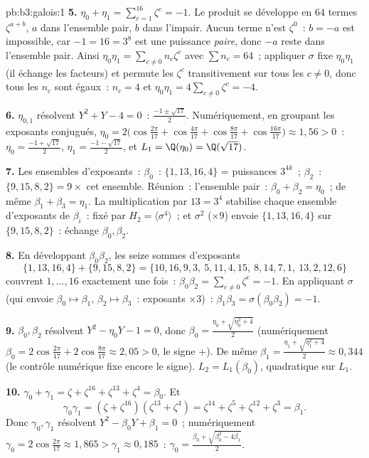 \begin{solution}{pb:b3:galois:1}
\textbf{5.} $\eta_0 + \eta_1 = \sum_{c=1}^{16}\zeta^c = -1$. Le
produit se développe en $64$ termes $\zeta^{a + b}$, $a$ dans
l'ensemble pair, $b$ dans l'impair. Aucun terme n'est
$\zeta^0$~: $b = -a$ est impossible, car $-1 = 16 = 3^8$ est
une puissance \emph{paire}, donc $-a$ reste dans l'ensemble
pair. Ainsi $\eta_0\eta_1 = \sum_{c \neq 0} n_c\zeta^c$ avec
$\sum n_c = 64$~; appliquer $\sigma$ fixe $\eta_0\eta_1$ (il
échange les facteurs) et permute les $\zeta^c$
transitivement sur tous les $c \neq 0$, donc tous les $n_c$
sont égaux~: $n_c = 4$ et $\eta_0\eta_1 =
4\sum_{c\neq0}\zeta^c = -4$.

\textbf{6.} $\eta_{0,1}$ résolvent $Y^2 + Y - 4 = 0$~:
$\frac{-1 \pm \sqrt{17}}2$. Numériquement, en groupant les
exposants conjugués, $\eta_0 = 2\bigl(\cos\tfrac{2\pi}{17} +
\cos\tfrac{4\pi}{17} + \cos\tfrac{8\pi}{17} +
\cos\tfrac{16\pi}{17}\bigr) \approx 1{,}56 > 0$~: $\eta_0 =
\frac{-1+\sqrt{17}}2$, $\eta_1 = \frac{-1-\sqrt{17}}2$, et
$L_1 = \Q(\eta_0) = \Q(\sqrt{17})$.

\textbf{7.} Les ensembles d'exposants~: $\beta_0$~: $\{1, 13,
16, 4\}$ = puissances $3^{4k}$~; $\beta_2$~: $\{9, 15, 8, 2\}
= 9 \times$ cet ensemble. Réunion~: l'ensemble pair~: $\beta_0
+ \beta_2 = \eta_0$~; de même $\beta_1 + \beta_3 = \eta_1$.
La multiplication par $13 = 3^4$ stabilise chaque ensemble
d'exposants de $\beta_i$~: fixé par $H_2 =
\langle\sigma^4\rangle$~; et $\sigma^2$ ($\times 9$) envoie
$\{1,13,16,4\}$ sur $\{9, 15, 8, 2\}$~: échange $\beta_0,
\beta_2$.

\textbf{8.} En développant $\beta_0\beta_2$, les seize sommes
d'exposants
\[
\{1,13,16,4\} + \{9,15,8,2\} =
\{10,16,9,3,\ 5,11,4,15,\ 8,14,7,1,\ 13,2,12,6\}
\]
couvrent $1, \dots, 16$ exactement une fois~: $\beta_0\beta_2
= \sum_{c\ne0}\zeta^c = -1$. En appliquant $\sigma$ (qui
envoie $\beta_0 \mapsto \beta_1$, $\beta_2 \mapsto \beta_3$~:
exposants $\times 3$)~: $\beta_1\beta_3 =
\sigma(\beta_0\beta_2) = -1$.

\textbf{9.} $\beta_0, \beta_2$ résolvent $Y^2 - \eta_0 Y - 1 =
0$, donc $\beta_0 = \frac{\eta_0 + \sqrt{\eta_0^2 + 4}}2$
(numériquement $\beta_0 = 2\cos\frac{2\pi}{17} +
2\cos\frac{8\pi}{17} \approx 2{,}05 > 0$, le signe $+$). De
même $\beta_1 = \frac{\eta_1 + \sqrt{\eta_1^2 + 4}}2 \approx
0{,}344$ (le contrôle numérique fixe encore le signe). $L_2 =
L_1(\beta_0)$, quadratique sur $L_1$.

\textbf{10.} $\gamma_0 + \gamma_1 = \zeta + \zeta^{16} +
\zeta^{13} + \zeta^4 = \beta_0$. Et
\[
\gamma_0\gamma_1 = (\zeta + \zeta^{16})(\zeta^{13} + \zeta^4)
= \zeta^{14} + \zeta^{5} + \zeta^{12} + \zeta^{3} = \beta_1 .
\]
Donc $\gamma_0, \gamma_1$ résolvent $Y^2 - \beta_0Y + \beta_1
= 0$~; numériquement $\gamma_0 = 2\cos\frac{2\pi}{17} \approx
1{,}865 > \gamma_1 \approx 0{,}185$~: $\gamma_0 =
\frac{\beta_0 + \sqrt{\beta_0^2 - 4\beta_1}}2$.


\end{solution}
